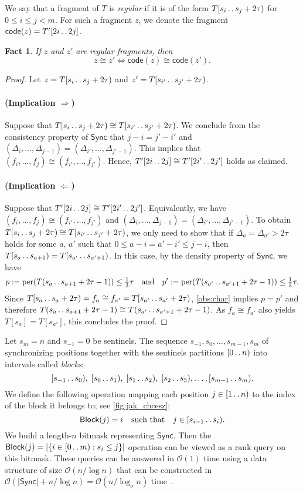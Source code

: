 \documentclass[a4paper]{article}
\newtheorem{fact}[theorem]{Fact}
\theoremstyle{definition}
\theoremstyle{remark}
\newcommand{\dd}{\mathinner{\ldotp\ldotp}}
\DeclareMathOperator{\per}{per}
\newcommand{\rank}{\mathrm{rank}}
\newcommand{\code}{\mathsf{code}}
\newcommand{\Oh}{\mathcal{O}}
\renewcommand{\S}{\mathsf{Sync}}
\renewcommand{\S}{\mathsf{Sync}}
\newcommand{\BLOCK}{\mathsf{Block}}
\begin{document}
We say that a fragment of $T$ is \emph{regular} if it is
of the form $T[s_i\dd s_j+2\tau)$ for $0 \le i \le j < m$. For such a fragment $z$, we denote the fragment $\code(z)=T'[2i\dd 2j]$.
\begin{fact}\label{fct:tp}
If $z$ and $z'$ are regular fragments, then \[z\cong z'\Longleftrightarrow \code(z)\cong \code(z').\]
\end{fact}
\begin{proof}
Let $z=T[s_i\dd s_j+2\tau)$ and  $z'=T[s_{i'}\dd s_{j'}+2\tau)$.

\paragraph*{(Implication $\Rightarrow$)}
Suppose that $T[s_i\dd s_j+2\tau)\cong T[s_{i'}\dd s_{j'}+2\tau)$.
We conclude from the consistency property of $\S$ that $j-i=j'-i'$ and $(\Delta_i,\ldots,\Delta_{j-1})=(\Delta_{i'},\ldots,\Delta_{j'-1})$.
This implies that $(f_i,\ldots,f_j)\cong (f_{i'},\ldots,f_{j'})$.
Hence, $T'[2i\dd 2j]\cong T'[2i'\dd 2j']$ holds as claimed.

\paragraph*{(Implication $\Leftarrow$)}
Suppose that $T'[2i\dd 2j]\cong T'[2i'\dd 2j']$.
Equivalently, we have $(f_i,\ldots,f_j)\cong (f_{i'},\ldots,f_{j'})$ and $(\Delta_i,\ldots,\Delta_{j-1})=(\Delta_{i'},\ldots,\Delta_{j'-1})$.
To obtain $T[s_i\dd s_j+2\tau)\cong T[s_{i'}\dd s_{j'}+2\tau)$, we only need to show that if $\Delta_{a}=\Delta_{a'}>2\tau$ holds for some $a$, $a'$ such that $0 \le a-i = a'-i' \le j-i$, then $T[s_{a} \dd s_{a+1}) = T[s_{a'} \dd s_{a'+1})$.
In this case, by the density property of $\S$, we have \[p:=\per(T(s_{a}\dd s_{a+1}+2\tau-1))\le \tfrac13\tau\quad\text{and}\quad
p':=\per(T(s_{a'}\dd s_{a'+1}+2\tau-1))\le \tfrac13\tau.\]
Since $T[s_{a}\dd s_{a}+2\tau)=f_a \cong f_{a'}=T[s_{a'}\dd s_{a'}+2\tau)$,
\cref{obs:char} implies $p=p'$ and therefore $T(s_{a}\dd s_{a+1}+2\tau-1)\cong T(s_{a'}\dd s_{a'+1}+2\tau-1)$.
As $f_a \cong f_{a'}$ also yields $T[s_a]=T[s_{a'}]$, this concludes the proof.
\end{proof}

Let $s_m=n$ and $s_{-1}=0$ be sentinels. 
The sequence $s_{-1},s_0,\ldots,s_{m-1},s_m$ of synchronizing positions
together with the sentinels partitions $[0\dd n)$ into
intervals called \emph{blocks}: 
\[[s_{-1} \dd s_0),\;[s_0\dd s_1),\; [s_1\dd s_2),\;
[s_2\dd s_3),\ldots, [s_{m-1}\dd s_m).\]
We define the following operation mapping each position $j\in [1\dd n)$ to the index of the block it belongs to;
see \cref{fig:jak_chcesz}:
\[\BLOCK(j)=i\quad \text{such that}\quad j\in [s_{i-1}\dd s_i).\]
We build a length-$n$ bitmask representing $\S$.
Then the $\BLOCK(j)=|\{i\in [0\dd m) : s_i \le j\}|$ operation can be viewed as a $\rank$ query on this bitmask.
These queries can be answered in $\Oh(1)$ time using a data structure of size $\Oh(n/\log n)$
that can be constructed in $\Oh(|\S|+n/\log n)=\Oh(n/\log_\sigma n)$ time~\cite{DBLP:conf/focs/Jacobson89,WaveletSuffixTree,DBLP:journals/tcs/MunroNV16}.
\end{document}
